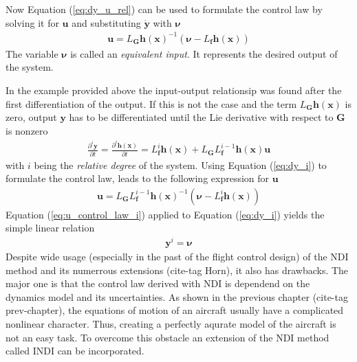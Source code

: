 \documentclass[11pt, a4paper, twoside]{report}
\begin{document}
Now Equation (\ref{eq:dy_u_rel}) can be used to formulate the control law by solving it for $\bm{u}$ and substituting $\dot{\bm{y}}$ with $\bm{\nu}$
\begin{equation}
	\begin{split}
		\bm{u} = L_{\bm{G}}\bm{h(x)}^{-1} (\bm{\nu} - L_{\bm{f}}\bm{h(x)})
		\label{eq:u_control_law}
	\end{split}
\end{equation}
The variable $\bm{\nu}$ is called an \textit{equivalent input}. It represents the desired output of the system. 

In the example provided above the input-output relationsip was found after the first differentiation of the output. If this is not the case and the term $L_{\bm{G}}\bm{h(x)}$ is zero, output $\bm{y}$ has to be differentiated until the Lie derivative with respect to $\bm{G}$ is nonzero
\begin{equation}
	\begin{split}
		\frac{\partial^i\bm{y}}{\partial t} = \frac{\partial^i\bm{h(x)}}{\partial t} = L_{\bm{f}}^i \bm{h(x)} + L_{\bm{G}} L_{\bm{f}}^{i-1} \bm{h(x) u}
		\label{eq:dy_i}
	\end{split}
\end{equation}
with $i$ being the \textit{relative degree} of the system. Using Equation (\ref{eq:dy_i}) to formulate the control law, leads to the following expression for $\bm{u}$
\begin{equation}
	\begin{split}
		\bm{u} = L_{\bm{G}} L_{\bm{f}}^{i-1} \bm{h(x)}^{-1} (\bm{\nu} - L_{\bm{f}}^i\bm{h(x)}) 
		\label{eq:u_control_law_i}
	\end{split}
\end{equation}
Equation (\ref{eq:u_control_law_i}) applied to Equation (\ref{eq:dy_i}) yields the simple linear relation
\begin{equation}
	\begin{split}
		\bm{y}^i = \bm{\nu}
		\label{eq:u_control_law_i}
	\end{split}
\end{equation}
Despite wide usage (especially in the past of the flight control design) of the \acrshort{NDI} method and its numerrous extensions (cite-tag Horn), it also has drawbacks. The major one is that the control law derived with \acrshort{NDI} is dependend on the dynamics model and its uncertainties. As shown in the previous chapter (cite-tag prev-chapter), the equations of motion of an aircraft usually have a complicated nonlinear character. Thus, creating a perfectly aqurate model of the aircraft is not an easy task. To overcome this obstacle an extension of the \acrshort{NDI} method called \acrshort{INDI} can be incorporated. 
\end{document}
